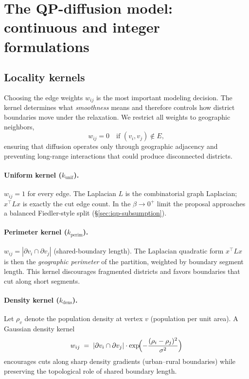 \documentclass[11pt]{article}
\begin{document}
\section{The QP-diffusion model: continuous and integer formulations}\label{sec:model}

\subsection{Locality kernels}\label{sec:kernels}

Choosing the edge weights $w_{ij}$ is the most important modeling
decision. The kernel determines what \emph{smoothness} means and
therefore controls how district boundaries move under the relaxation.
We restrict all weights to geographic neighbors,
\begin{equation}\label{eq:kernel-local}
  w_{ij} = 0 \quad \text{if } (v_i, v_j) \notin E,
\end{equation}
ensuring that diffusion operates only through geographic adjacency and
preventing long-range interactions that could produce disconnected
districts.

\paragraph{Uniform kernel ($k_{\mathrm{unif}}$).} $w_{ij} = 1$ for
every edge. The Laplacian $L$ is the combinatorial graph Laplacian;
$x^\top L x$ is exactly the cut edge count. In the $\beta \to 0^+$
limit the proposal approaches a balanced Fiedler-style split
(\S\ref{sec:iqp-subsumption}).

\paragraph{Perimeter kernel ($k_{\mathrm{perim}}$).} $w_{ij} = |\partial v_i \cap \partial v_j|$
(shared-boundary length). The Laplacian quadratic form $x^\top L x$
is then the \emph{geographic perimeter} of the partition, weighted by
boundary segment length. This kernel discourages fragmented districts
and favors boundaries that cut along short segments.

\paragraph{Density kernel ($k_{\mathrm{dens}}$).} Let $\rho_v$ denote
the population density at vertex $v$ (population per unit area). A
Gaussian density kernel
\[
  w_{ij} \;=\; |\partial v_i \cap \partial v_j| \cdot
  \exp\!\Bigl( -\frac{(\rho_i - \rho_j)^2}{\sigma^2} \Bigr)
\]
encourages cuts along sharp density gradients (urban--rural
boundaries) while preserving the topological role of shared boundary
length.
\end{document}
